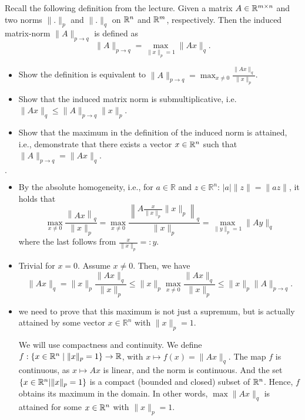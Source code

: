 \documentclass{ExerciseSheet}
\newif\ifsolutions
\begin{document}
\begin{problem}
Recall the following definition from the lecture. Given a matrix $A\in \mathbb{R}^{m\times n}$ and two norms $\| .\|_p$ and $\|.\|_q$ on $\mathbb{R}^n$ and $\mathbb{R}^m$, respectively. Then the induced matrix-norm $\|A\|_{p\rightarrow q} $ is defined as 
\begin{equation*}
    \|A\|_{p\rightarrow q} = \max_{\|x\|_p=1} \|Ax\|_q.
\end{equation*}
\begin{itemize}
 \item Show the definition is equivalent to $\|A\|_{p\rightarrow q} = \max_{x\neq 0} \frac{\|Ax\|_q}{\|x\|_p}$.
\item Show that the induced matrix norm is submultiplicative, i.e. $\|Ax\|_q \leq \|A\|_{p\rightarrow q} \|x\|_p$.
    \item Show that the maximum in the definition of the induced norm is attained, i.e., demonstrate that there exists a vector $x \in \mathbb{R}^n$ such that $\|A\|_{p\rightarrow q} =  \|Ax\|_q$.
   
    
\end{itemize}
\end{problem}

\ifsolutions
\vskip 0.3cm
\begin{solution}
$.$
\begin{itemize}
    \item   
    By the absolute homogeneity, i.e., for $a\in\mathbb{R}$ and $z\in\mathbb{R}^n$: $|a|\lVert z\rVert=\lVert az\rVert$, it holds that 
    \begin{equation*}
         \max_{x\not=0}\frac{\left\lVert Ax\right\rVert_q}{\lVert x\rVert_p}= \max_{x\not=0}\frac{\left\lVert A\frac{x}{\lVert x\rVert_p}\lVert x\rVert_p\right\rVert_q}{\lVert x\rVert_p}= \max_{\lVert y\rVert_p=1}\lVert Ay\rVert_q
    \end{equation*}
    where the last follows from $\frac{x}{\lVert x\rVert_p}=:y$.
    \item Trivial for $x=0$. Assume $x\neq 0$. Then, we have
    \begin{equation*}
        \|Ax\|_q = \|x\|_p \frac{\|Ax\|_q}{\|x\|_p} \leq \|x\|_p \max_{x\neq 0} \frac{\|Ax\|_q}{\|x\|_p} \leq \|x\|_p \|A\|_{p\rightarrow q}.
    \end{equation*}
    \item we need to prove that this maximum is not just a supremum, but is actually attained by some vector $x\in\mathbb{R}^n$ with $\lVert x\rVert_p=1$. 
    
    We will use compactness and continuity. We define $f:\{x\in \mathbb{R}^n\mid \|x\|_p=1\}\rightarrow \mathbb{R}$, with $ x \mapsto f(x)=\|Ax\|_q$. The map $f$ is continuous, as $x\mapsto Ax$ is linear, and the norm is continuous. And the set $\{x\in \mathbb{R}^n| \|x\|_p=1\}$ is a compact (bounded and closed) subset of $\mathbb{R}^n$. Hence, $f$ obtains its maximum in the domain. In other words, $\max \|Ax\|_q$ is attained for some $x\in\mathbb{R}^n$ with $\lVert x\rVert_p=1$.
\end{itemize}
\end{solution}
\end{document}
